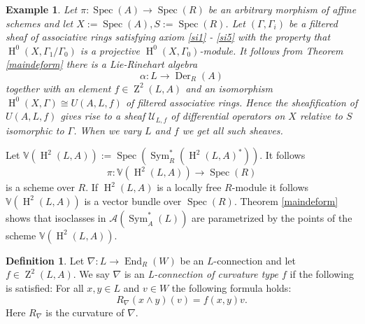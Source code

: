 \documentclass{amsart}
\theoremstyle{plain}
\newtheorem{example}[theorem]{Example}
\theoremstyle{definition}
\newtheorem{definition}[theorem]{Definition}
\theoremstyle{remark}
\numberwithin{equation}{theorem}
\begin{document}
\begin{example} 

Let $\pi:{\operatorname{Spec} }({A})\rightarrow {\operatorname{Spec} }({R})$ be an arbitrary morphism of affine schemes and let $X:={\operatorname{Spec} }({A}), S:={\operatorname{Spec} }({R})$. Let
$(\Gamma, \Gamma_i)$ be a filtered sheaf of associative rings satisfying axiom \ref{si1} - \ref{si5} with the property
that ${\operatorname{H} }^0(X, \Gamma_1/\Gamma_0)$ is a projective ${\operatorname{H} }^0(X,\Gamma_0)$-module. 
It follows from Theorem \ref{maindeform} there is a Lie-Rinehart algebra 
\[ \alpha:L\rightarrow {\operatorname{Der} }_{R}({A}) \]
together with an element $f\in {\operatorname{Z}}^2(L,{A})$ and an isomorphism ${\operatorname{H} }^0(X, \Gamma)\cong U({A},L,f)$ of filtered associative rings.
Hence the sheafification of $U({A},L,f)$ gives rise to a sheaf $\mathcal{U}_{L,f}$ 
of differential operators on $X$ relative to $S$ isomorphic to $\Gamma$. When we vary $L$ and $f$ we get all such sheaves.
\end{example}

Let $\mathbb{V}({\operatorname{H} }^2(L,{A})):={\operatorname{Spec} }({\operatorname{Sym} }_{R}^*({\operatorname{H} }^2(L,{A})^*))$. It follows
\[\pi:\mathbb{V}({\operatorname{H} }^2(L,{A}))\rightarrow {\operatorname{Spec} }({R}) \]
is a scheme over ${R}$. If ${\operatorname{H} }^2(L,{A})$ is a locally free ${R}$-module it follows $\mathbb{V}({\operatorname{H} }^2(L,{A}))$ is a vector bundle 
over ${\operatorname{Spec} }({R})$. Theorem \ref{maindeform} shows that isoclasses in ${\mathcal{A}} ({\operatorname{Sym} }_{A}^*(L))$ are parametrized by the points 
of the scheme $\mathbb{V}({\operatorname{H} }^2(L,{A}))$. 

\begin{definition}
Let $\nabla:L\rightarrow {\operatorname{End} }_{R}(W)$ be an $L$-connection and let $f\in {\operatorname{Z}}^2(L,{A})$.
We say $\nabla$ is an \emph{L-connection of curvature type $f$} if the following is satisfied:
For all $x,y\in L$ and $v\in W$ the following formula holds:
\[ R_\nabla(x\wedge y)(v)=f(x,y)v.\]
Here $R_\nabla$ is the curvature of $\nabla$.
\end{definition}
\end{document}
